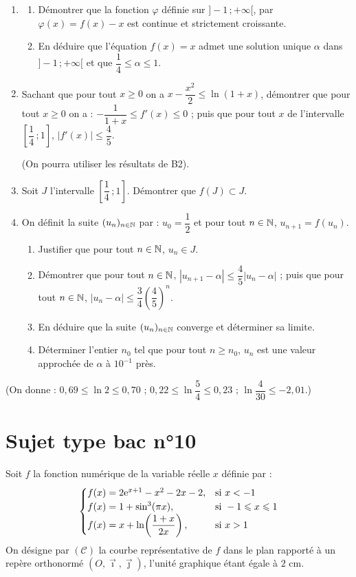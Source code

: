 \begin{enumerate}
	\item
	\begin{enumerate}
		\item Démontrer que la fonction $\varphi$ définie sur $]-1\,;+\infty[$, par $\varphi(x)=f(x)-x$ est continue et strictement croissante.
		\item En déduire que l'équation $f(x)=x$ admet une solution unique $\alpha$ dans $]-1\,;+\infty[$ et que $\dfrac14 \leqslant \alpha \leqslant 1$.
	\end{enumerate}
	\item Sachant que pour tout $x \geqslant 0$ on a $x-\dfrac{x^2}{2} \leqslant \ln(1+x)$, démontrer que pour tout $x \geqslant 0$ on a : $-\dfrac{1}{1+x} \leqslant f'(x) \leqslant 0$ ; puis que pour tout $x$ de l'intervalle $\left[\dfrac14\,;1\right]$, $|f'(x)| \leqslant \dfrac45$.

	(On pourra utiliser les résultats de B2).
	\item Soit $J$ l'intervalle $\left[\dfrac14\,;1\right]$. Démontrer que $f(J)\subset J$.
	\item On définit la suite $(u_n)_{n\in\mathbb{N}}$ par : $u_0=\dfrac12$ et pour tout $n\in\mathbb{N}$, $u_{n+1}=f(u_n)$.
	\begin{enumerate}
		\item Justifier que pour tout $n\in\mathbb{N}$, $u_n\in J$.
		\item Démontrer que pour tout $n\in\mathbb{N}$, $|u_{n+1}-\alpha|\leqslant\dfrac45|u_n-\alpha|$ ; puis que pour tout $n\in\mathbb{N}$, $|u_n-\alpha|\leqslant\dfrac34\left(\dfrac45\right)^n$.
		\item En déduire que la suite $(u_n)_{n\in\mathbb{N}}$ converge et déterminer sa limite.
		\item Déterminer l'entier $n_0$ tel que pour tout $n\geqslant n_0$, $u_n$ est une valeur approchée de $\alpha$ à $10^{-1}$ près.
	\end{enumerate}
\end{enumerate}

(On donne : $0,69\leqslant\ln2\leqslant0,70$ ; $0,22\leqslant\ln\dfrac54\leqslant0,23$ ; $\ln\dfrac{4}{30}\leqslant-2,01$.)


\section*{Sujet type bac n°10}

Soit $f$ la fonction numérique de la variable réelle $x$ définie par :
\[
\begin{cases}
	f(x) = 2\mathrm{e}^{x+1}-x^2-2x-2, & \text{si } x<-1 \\
	f(x) = 1+\sin^3(\pi x), & \text{si } -1\leqslant x\leqslant1 \\
	f(x) = x+\ln\!\left(\dfrac{1+x}{2x}\right), & \text{si } x>1
\end{cases}
\]
On désigne par $(\mathscr{C})$ la courbe représentative de $f$ dans le plan rapporté à un repère orthonormé $(O,\vec{\imath},\vec{\jmath})$, l'unité graphique étant égale à $2$ cm.

